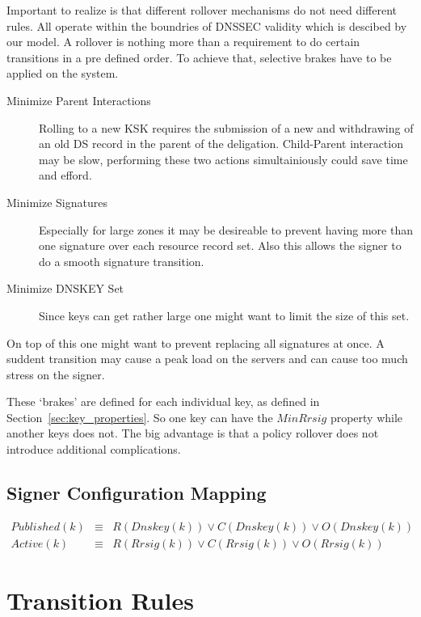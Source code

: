 \documentclass[twoside,english, a4paper]{article}
\begin{document}
Important to realize is that different rollover mechanisms do not need
different rules. All operate within the boundries of DNSSEC validity
which is descibed by our model. A rollover is nothing more than a
requirement to do certain transitions in a pre defined order. To achieve
that, selective brakes have to be applied on the system.

\begin{description}
\item [Minimize Parent Interactions]
	Rolling to a new KSK requires the
	submission of a new and withdrawing of an old DS record in the parent of
	the deligation. Child-Parent interaction may be slow, performing
	these two actions simultainiously could save time and efford.
\item [Minimize Signatures]
	Especially for large zones it may be 
	desireable to prevent having more than one signature over each 
	resource record set. Also this allows the signer to do a smooth
	signature transition.
\item [Minimize DNSKEY Set] Since keys can get rather large one might
	want to limit the size of this set.
\end{description}

On top of this one might want to prevent replacing all signatures at 
once. A suddent transition may cause a peak load on the servers and can
cause too much stress on the signer. 

These `brakes' are defined for each individual key, as defined in 
Section~\ref{sec:key_properties}. So one key can have the $MinRrsig$ 
property while another keys does not. The big advantage is that a 
policy rollover does not introduce additional complications. 



\subsection{Signer Configuration Mapping}

\begin{eqnarray}
Published(k) &\equiv & R(Dnskey(k)) \vee C(Dnskey(k)) \vee O(Dnskey(k)) \\
Active(k) &\equiv & R(Rrsig(k)) \vee C(Rrsig(k)) \vee O(Rrsig(k))
\end{eqnarray}

\section{Transition Rules}
\end{document}
